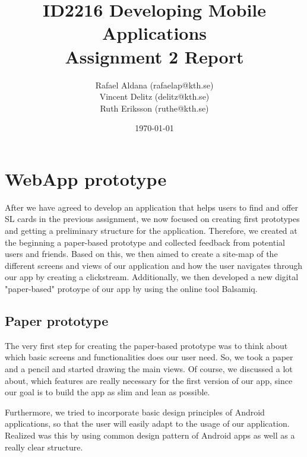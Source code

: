 \documentclass[11pt,twoside,a4paper]{report}
\begin{document}
\title{ID2216 Developing Mobile Applications\\Assignment 2 Report}
\author{Rafael Aldana (rafaelap@kth.se)\\Vincent Delitz (delitz@kth.se)\\Ruth Eriksson (ruthe@kth.se)}
\date{\today}
\maketitle

\newpage


\tableofcontents



\newpage

\chapter{WebApp prototype}

After we have agreed to develop an application that helps users to find and offer SL cards in the previous assignment, we now focused on creating first prototypes and getting a preliminary structure for the application. Therefore, we created at the beginning a paper-based prototype and collected feedback from potential users and friends. Based on this, we then aimed to create a site-map of the different screens and views of our application and how the user navigates through our app by creating a clickstream. Additionally, we then developed a new digital "paper-based" protoype of our app by using the online tool Balsamiq.

\section{Paper prototype}

The very first step for creating the paper-based prototype was to think about which basic screens and functionalities does our user need. So, we took a paper and a pencil and started drawing the main views. Of course, we discussed a lot about, which features are really necessary for the first version of our app, since our goal is to build the app as slim and lean as possible.

Furthermore, we tried to incorporate basic design principles of Android applications, so that the user will easily adapt to the usage of our application. Realized was this by using common design pattern of Android apps as well as a really clear structure.
\end{document}
